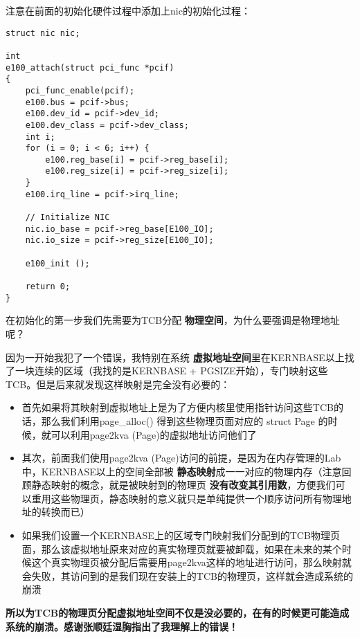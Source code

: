 \documentclass{article}
\newcommand{\highlight}[1]{{\bfseries \color{red}  #1}}
\newcommand{\funcname}[1]{{\ttfamily \small #1}}
\begin{document}
\begin{CJK*}{UTF8}{gkai}
注意在前面的初始化硬件过程中添加上nic的初始化过程：

\begin{lstlisting}[style=ccode, title={\scriptsize \ttfamily \bfseries kern/e100.c}]
struct nic nic;

int
e100_attach(struct pci_func *pcif) 
{
    pci_func_enable(pcif);
    e100.bus = pcif->bus;
    e100.dev_id = pcif->dev_id;
    e100.dev_class = pcif->dev_class;
    int i;
    for (i = 0; i < 6; i++) {
    	e100.reg_base[i] = pcif->reg_base[i];
        e100.reg_size[i] = pcif->reg_size[i];
    }
    e100.irq_line = pcif->irq_line;

    // Initialize NIC
    nic.io_base = pcif->reg_base[E100_IO];
    nic.io_size = pcif->reg_size[E100_IO];

    e100_init ();

    return 0;
}
\end{lstlisting}

在初始化的第一步我们先需要为TCB分配\highlight{物理空间}，为什么要强调是物理地址呢？

因为一开始我犯了一个错误，我特别在系统\highlight{虚拟地址空间}里在KERNBASE以上找了一块连续的区域（我找的是KERNBASE + PGSIZE开始），专门映射这些TCB。但是后来就发现这样映射是完全没有必要的：

\begin{itemize}
\item{首先如果将其映射到虚拟地址上是为了方便内核里使用指针访问这些TCB的话，那么我们利用\funcname{page\_alloc()} 得到这些物理页面对应的 struct Page 的时候，就可以利用page2kva (Page)的虚拟地址访问他们了}

\item{其次，前面我们使用page2kva (Page)访问的前提，是因为在内存管理的Lab中，KERNBASE以上的空间全部被\highlight{静态映射}成一一对应的物理内存（注意回顾静态映射的概念，就是被映射到的物理页\highlight{没有改变其引用数}，方便我们可以重用这些物理页，静态映射的意义就只是单纯提供一个顺序访问所有物理地址的转换而已）}

\item{如果我们设置一个KERNBASE上的区域专门映射我们分配到的TCB物理页面，那么该虚拟地址原来对应的真实物理页就要被卸载，如果在未来的某个时候这个真实物理页被分配后需要用page2kva这样的地址进行访问，那么映射就会失败，其访问到的是我们现在安装上的TCB的物理页，这样就会造成系统的崩溃}
\end{itemize}

{\bfseries \large \color{red} 所以为TCB的物理页分配虚拟地址空间不仅是没必要的，在有的时候更可能造成系统的崩溃。感谢张顺廷湿胸指出了我理解上的错误！}


\end{CJK*}
\end{document}
